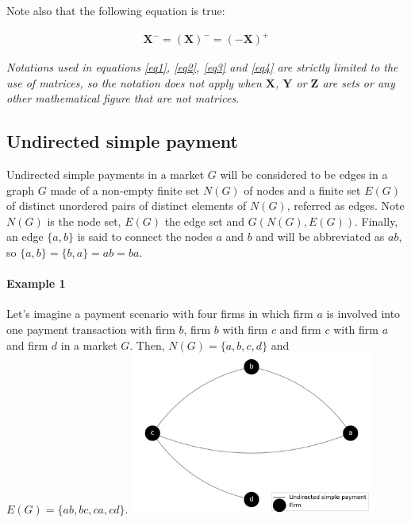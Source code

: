 \documentclass[12pt]{article}
\begin{document}
\begin{multicols}{2}
 Note also that the following equation is true: 
  
 \begin{equation} \label{eq4}
\begin{split}
    \mathbf{X}^{-} = (\mathbf{X})^{-} = (-\mathbf{X})^{+}
\end{split}
\end{equation}

\emph{Notations used in equations \ref{eq1}, \ref{eq2}, \ref{eq3} and \ref{eq4} are strictly limited to the use of matrices, so the notation does not apply when $\textbf{X}$, $\textbf{Y}$ or $\textbf{Z}$ are sets or any other mathematical figure that are not matrices.}

\subsection{Undirected simple payment}\label{usp}
Undirected simple payments in a market $G$ will be considered to be edges in a graph $G$ made of a non-empty finite set $N(G)$ of nodes and a finite set $E(G)$ of distinct unordered pairs of distinct elements of $N(G)$, referred as edges. Note $N(G)$ is the node set, $E(G)$ the edge set and $G(N(G), E(G))$. Finally, an edge $\{a, b\}$ is said to connect the nodes $a$ and $b$ and will be abbreviated as $ab$, so $\{a, b\} = \{b, a\} = ab = ba$.

\begin{mdframed}
\paragraph{Example 1} \label{ex1}
Let's imagine a payment scenario with four firms in which firm $a$ is involved into one payment transaction with firm $b$, firm $b$ with firm $c$ and firm $c$ with firm $a$ and firm $d$ in a market $G$. Then, $N(G) = \{a, b, c, d\}$ and $E(G) = \{ab, bc, ca, cd\}$.
{
 \includegraphics[width=8cm]{figures/F1.pdf}
 \vspace{0.5cm}
}
\end{mdframed}


\end{multicols}
\end{document}
